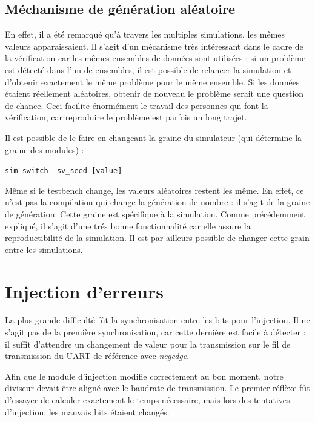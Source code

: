 \documentclass[12pt, titlepage]{article}
\begin{document}
    \subsection{Méchanisme de génération aléatoire}
    En effet, il a été remarqué qu'à travers les multiples simulations, les mêmes valeurs apparaissaient. Il s'agit d'un mécanisme très intéressant dans le cadre de la vérification car les mêmes ensembles de données sont utilisées : si un problème est détecté dans l'un de ensembles, il est possible de relancer la simulation et d'obtenir exactement le même problème pour le même ensemble. Si les données étaient réellement aléatoires, obtenir de nouveau le problème serait une question de chance. Ceci facilite énormément le travail des personnes qui font la vérification, car reproduire le problème est parfois un long trajet.

    Il est possible de le faire en changeant la graine du simulateur (qui détermine la graine des modules) :

    \texttt{sim switch -sv\_seed [value]}
    
    Même si le testbench change, les valeurs aléatoires restent les même. En effet, ce n'est pas la compilation qui change la génération de nombre : il s'agit de la graine de génération. Cette graine est spécifique à la simulation. Comme précédemment expliqué, il s'agit d'une trés bonne fonctionnalité car elle assure la reproductibilité de la simulation. Il est par ailleurs possible de changer cette grain entre les simulations.
    

\section{Injection d'erreurs} 
	
	
	
	La plus grande difficulté fût la synchronisation entre les bits pour l'injection. Il ne s'agit pas de la première synchronisation, car cette dernière est facile à détecter : il suffit d'attendre un changement de valeur pour la transmission sur le fil de transmission du UART de référence avec \emph{negedge}.
	
	 Afin que le module d'injection modifie correctement au bon moment, notre diviseur devait être aligné avec le baudrate de transmission. Le premier réflèxe fût d'essayer de calculer exactement le temps nécessaire, mais lors des tentatives d'injection, les mauvais bits étaient changés. 
	
\end{document}
